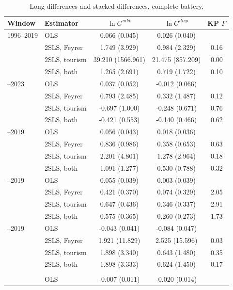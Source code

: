 \begin{table}[H]\centering\caption{Long differences and stacked differences, complete battery.}\label{tab:a_longdiff}
\begin{threeparttable}\small\begin{tabular}{llccc}
\toprule
Window & Estimator & $\ln G^{mkt}$ & $\ln G^{disp}$ & KP $F$ \\
\midrule
1996--2019 & OLS & 0.066 (0.045) & 0.026 (0.040) &  \\
 & 2SLS, Feyrer & 1.749 (3.929) & 0.984 (2.329) & 0.16 \\
 & 2SLS, tourism & 39.210 (1566.961) & 21.475 (857.209) & 0.00 \\
 & 2SLS, both & 1.265 (2.691) & 0.719 (1.722) & 0.10 \\
\addlinespace
1996--2023 & OLS & 0.037 (0.052) & -0.012 (0.066) &  \\
 & 2SLS, Feyrer & 0.793 (2.485) & 0.332 (1.487) & 0.12 \\
 & 2SLS, tourism & -0.697 (1.000) & -0.248 (0.671) & 0.76 \\
 & 2SLS, both & -0.421 (0.553) & -0.140 (0.466) & 0.62 \\
\addlinespace
2000--2019 & OLS & 0.056 (0.043) & 0.018 (0.036) &  \\
 & 2SLS, Feyrer & 0.836 (0.986) & 0.358 (0.653) & 0.63 \\
 & 2SLS, tourism & 2.201 (4.801) & 1.278 (2.964) & 0.18 \\
 & 2SLS, both & 1.091 (1.277) & 0.530 (0.788) & 0.32 \\
\addlinespace
2005--2019 & OLS & 0.055 (0.039) & 0.003 (0.039) &  \\
 & 2SLS, Feyrer & 0.421 (0.370) & 0.074 (0.329) & 2.05 \\
 & 2SLS, tourism & 0.647 (0.436) & 0.346 (0.337) & 2.91 \\
 & 2SLS, both & 0.575 (0.365) & 0.260 (0.273) & 1.73 \\
\addlinespace
2010--2019 & OLS & -0.043 (0.041) & -0.084\sym{*} (0.047) &  \\
 & 2SLS, Feyrer & 1.921 (11.829) & 2.525 (15.596) & 0.03 \\
 & 2SLS, tourism & 1.898 (3.340) & 0.643 (1.480) & 0.35 \\
 & 2SLS, both & 1.898 (3.333) & 0.624 (1.450) & 0.17 \\
\addlinespace\multicolumn{5}{l}{\emph{Stacked five-year differences}}\\
 & OLS & -0.007 (0.011) & -0.020 (0.014) &  \\

\end{tabular}
\end{threeparttable}
\end{table}
